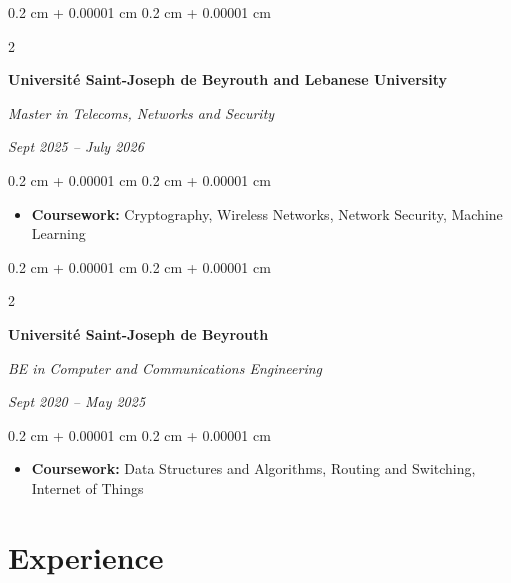 \documentclass[10pt, letterpaper]{article}
\newenvironment{highlights}{
    \begin{itemize}[
        topsep=0.10 cm,
        parsep=0.10 cm,
        partopsep=0pt,
        itemsep=0pt,
        leftmargin=0.4 cm + 10pt
    ]
}{
    \end{itemize}
} %
\newenvironment{onecolentry}{
    \begin{adjustwidth}{
        0.2 cm + 0.00001 cm
    }{
        0.2 cm + 0.00001 cm
    }
}{
    \end{adjustwidth}
} %
\newenvironment{twocolentry}[2][]{
    \onecolentry
    \def\secondColumn{#2}
    \setcolumnwidth{\fill, 4.5 cm}
    \begin{paracol}{2}
}{
    \switchcolumn \raggedleft \secondColumn
    \end{paracol}
    \endonecolentry
} %
\begin{document}
         



    \begin{twocolentry}{
            
            
        \textit{Sept 2025 – July 2026}}
            \textbf{Université Saint-Joseph de Beyrouth and Lebanese University}

            \textit{Master in Telecoms, Networks and Security }
        \end{twocolentry}
         \vspace{0.10 cm}
        \begin{onecolentry}
            \begin{highlights}
                
                \item \textbf{Coursework:} Cryptography, Wireless Networks, Network Security, Machine Learning
            \end{highlights}
        \end{onecolentry}

        \vspace{0.20 cm}
        



        
        \begin{twocolentry}{
            
            
        \textit{Sept 2020 – May 2025}}
            \textbf{Université Saint-Joseph de Beyrouth}

            \textit{BE in Computer and Communications Engineering}
        \end{twocolentry}

        \vspace{0.10 cm}
        \begin{onecolentry}
            \begin{highlights}
                
                \item \textbf{Coursework:} Data Structures and Algorithms, Routing and Switching, Internet of Things
            \end{highlights}
        \end{onecolentry}
        
            

        



    
    \section{Experience}
\end{document}
